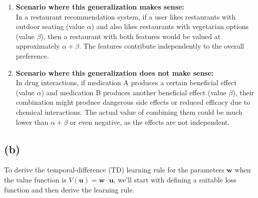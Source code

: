 \documentclass{article}
\begin{document}
\begin{enumerate}
    \item \textbf{Scenario where this generalization makes sense:}\\
    In a restaurant recommendation system, if a user likes restaurants with outdoor seating (value $\alpha$) and also likes restaurants with vegetarian options (value $\beta$), then a restaurant with both features would be valued at approximately $\alpha + \beta$. The features contribute independently to the overall preference.

    \item \textbf{Scenario where this generalization does not make sense:}\\
    In drug interactions, if medication A produces a certain beneficial effect (value $\alpha$) and medication B produces another beneficial effect (value $\beta$), their combination might produce dangerous side effects or reduced efficacy due to chemical interactions. The actual value of combining them could be much lower than $\alpha + \beta$ or even negative, as the effects are not independent.
\end{enumerate}

\subsection*{(b)}


To derive the temporal-difference (TD) learning rule for the parameters $\mathbf{w}$ when the value function is $V(\mathbf{u}) = \mathbf{w} \cdot \mathbf{u}$, we'll start with defining a suitable loss function and then derive the learning rule.
\end{document}
